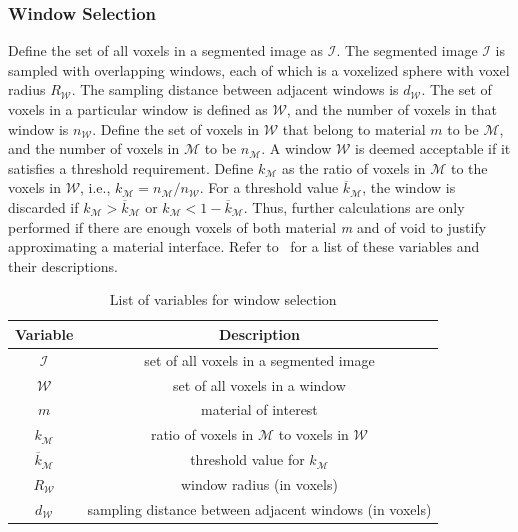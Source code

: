 \subsubsection{Window Selection}

Define the set of all voxels in a segmented image as $\mathcal{I}$. The segmented image  $\mathcal{I}$ is sampled with overlapping windows, each of which is a voxelized sphere with voxel radius $R_{\mathcal{W}}$. The sampling distance between adjacent windows is $d_{\mathcal{W}}$. The set of voxels in a particular window is defined as $\mathcal{W}$, and the number of voxels in that window is $n_{\mathcal{W}}$. Define the set of voxels in $\mathcal{W}$ that belong to material $m$ to be $\mathcal{M}$, and the number of voxels in $\mathcal{M}$ to be $n_{\mathcal{M}}$. A window $\mathcal{W}$ is deemed acceptable if it satisfies a threshold requirement. Define $k_{\mathcal{M}}$ as the ratio of voxels in $\mathcal{M}$ to the voxels in $\mathcal{W}$, i.e., $k_{\mathcal{M}} = n_{\mathcal{M}}/n_{\mathcal{W}}$. For a threshold value $\overline{k}_{\mathcal{M}}$, the window is discarded if $k_{\mathcal{M}} > \overline{k}_{\mathcal{M}}$ or $k_{\mathcal{M}} < 1 - \overline{k}_{\mathcal{M}}$. Thus, further calculations are only performed if there are enough voxels of both material \textit{m} and of void to justify approximating a material interface. Refer to~ for a list of these variables and their descriptions. 

\begin{table}[htbp!]
 \centering
   \begin{tabular}{|c||c|}
   \hline
   {\textbf{Variable}} & \textbf{Description} \\ \hline \hline
   $\mathcal{I}$ & set of all voxels in a segmented image \\ \hline
   $\mathcal{W}$ & set of all voxels in a window \\ \hline
   $m$ & material of interest \\ \hline
   {$k_{\mathcal{M}}$} & ratio of voxels in $\mathcal{M}$ to voxels in $\mathcal{W}$\\ \hline
   {$\overline{k}_{\mathcal{M}}$ \rule{0mm}{4mm}} & threshold value for $k_{\mathcal{M}}$ \\ \hline 
   $R_{\mathcal{W}}$ & window radius (in voxels) \\ \hline
   $d_{\mathcal{W}}$ & sampling distance between adjacent windows (in voxels) \\ \hline  
\end{tabular}
\caption{List of variables for window selection}
\label{tab:window}
\end{table}

